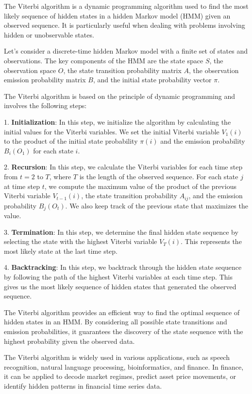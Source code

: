 \documentclass[a4paper,11pt]{article}
\begin{document}
The Viterbi algorithm is a dynamic programming algorithm used to find the most likely sequence of hidden states in a hidden Markov model (HMM) given an observed sequence. It is particularly useful when dealing with problems involving hidden or unobservable states.

Let's consider a discrete-time hidden Markov model with a finite set of states and observations. The key components of the HMM are the state space $S$, the observation space $O$, the state transition probability matrix $A$, the observation emission probability matrix $B$, and the initial state probability vector $\pi$.

The Viterbi algorithm is based on the principle of dynamic programming and involves the following steps:

1. \textbf{Initialization}: In this step, we initialize the algorithm by calculating the initial values for the Viterbi variables. We set the initial Viterbi variable $V_{1}(i)$ to the product of the initial state probability $\pi(i)$ and the emission probability $B_{i}(O_1)$ for each state $i$.

2. \textbf{Recursion}: In this step, we calculate the Viterbi variables for each time step from $t = 2$ to $T$, where $T$ is the length of the observed sequence. For each state $j$ at time step $t$, we compute the maximum value of the product of the previous Viterbi variable $V_{t-1}(i)$, the state transition probability $A_{ij}$, and the emission probability $B_{j}(O_t)$. We also keep track of the previous state that maximizes the value.

3. \textbf{Termination}: In this step, we determine the final hidden state sequence by selecting the state with the highest Viterbi variable $V_{T}(i)$. This represents the most likely state at the last time step.

4. \textbf{Backtracking}: In this step, we backtrack through the hidden state sequence by following the path of the highest Viterbi variables at each time step. This gives us the most likely sequence of hidden states that generated the observed sequence.

The Viterbi algorithm provides an efficient way to find the optimal sequence of hidden states in an HMM. By considering all possible state transitions and emission probabilities, it guarantees the discovery of the state sequence with the highest probability given the observed data.

The Viterbi algorithm is widely used in various applications, such as speech recognition, natural language processing, bioinformatics, and finance. In finance, it can be applied to decode market regimes, predict asset price movements, or identify hidden patterns in financial time series data.
\end{document}
